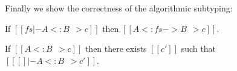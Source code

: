 Finally we show the correctness of the algorithmic subtyping:

\begin{theorem}[Soundness]
  If $[[ fs |- A <: B ~~> c]]$ then $ [[   A <: fs -> B ~~> c  ]]   $.
\end{theorem}

\begin{theorem}[Completeness] \label{thm:complete}
  If $[[A <: B ~~> c]]$ then there exists $[[c']]$ such that $[[ [] |- A <: B ~~> c']]$.
\end{theorem}



